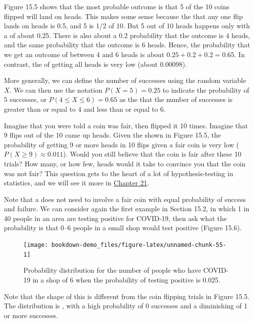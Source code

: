 \documentclass[
  openany]{krantz}
\begin{document}
Figure 15.5 shows that the most probable outcome is that 5 of the 10 coins flipped will land on heads.
This makes some sense because the  that any one flip lands on heads is 0.5, and 5 is 1/2 of 10.
But 5 out of 10 heads happens only with a  of about 0.25.
There is also about a 0.2 probability that the outcome is 4 heads, and the same probability that the outcome is 6 heads.
Hence, the probability that we get an outcome of between 4 and 6 heads is about \(0.25 + 0.2 + 0.2 = 0.65\).
In contrast, the  of getting all heads is very low (about 0.00098).

More generally, we can define the number of successes using the random variable \(X\).
We can then use the notation \(P(X = 5) = 0.25\) to indicate the probability of 5 successes, or \(P(4 \leq X \leq 6) = 0.65\) as the  that the number of successes is greater than or equal to 4 and less than or equal to 6.

Imagine that you were told a coin was fair, then flipped it 10 times.
Imagine that 9 flips out of the 10 came up heads.
Given the  shown in Figure 15.5, the probability of getting 9 or more heads in 10 flips given a fair coin is very low (\(P(X \geq 9) \approx 0.011\)).
Would you still believe that the coin is fair after these 10 trials?
How many, or how few, heads would it take to convince you that the coin was not fair?
This question gets to the heart of a lot of hypothesis-testing in statistics, and we will see it more in \protect\hyperlink{Chapter_21}{Chapter 21}.

Note that a  does not need to involve a fair coin with equal probability of success and failure.
We can consider again the first example in Section 15.2, in which 1 in 40 people in an area are testing positive for COVID-19, then ask what the probability is that 0--6 people in a small shop would test positive (Figure 15.6).

\begin{figure}
\texttt{[image: bookdown-demo\_files/figure-latex/unnamed-chunk-55-1]} \caption{Probability distribution for the number of people who have COVID-19 in a shop of 6 when the probability of testing positive is 0.025.}\label{fig:unnamed-chunk-55}
\end{figure}

Note that the shape of this  is different from the coin flipping trials in Figure 15.5.
The distribution is , with a high probability of 0 successes and a diminishing  of 1 or more successes.
\end{document}
